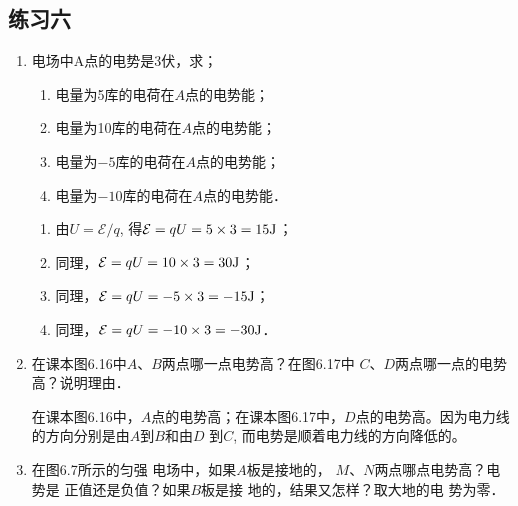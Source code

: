 \subsection{练习六}

\begin{enumerate}
	\item 电场中A点的电势是3伏，求；
	\begin{enumerate}
		\item 电量为5库的电荷在$A$点的电势能；
		\item 电量为10库的电荷在$A$点的电势能；
		\item 电量为$-5$库的电荷在$A$点的电势能；
		\item 电量为$-10$库的电荷在$A$点的电势能．
	\end{enumerate}

    \begin{solution}
\begin{enumerate}
    \item 由$U=\mathcal{E}/q$, 得$\mathcal{E}=qU=5\times3=15{\rm J}$；
    \item 同理，$\mathcal{E}=qU=10\times3=30{\rm J}$；
    \item 同理，$\mathcal{E}=qU=-5\times3=-15{\rm J}$；
    \item 同理，$\mathcal{E}=qU=-10\times3=-30{\rm J}$．
\end{enumerate}
    \end{solution}
    
	\item 在课本图6.16中$A$、$B$两点哪一点电势高？在图6.17中
$C$、$D$两点哪一点的电势高？说明理由．


\begin{solution}
    在课本图6.16中，$A$点的电势高；在课本图6.17中，$D$点的电势高。因为电力线的方向分别是由$A$到$B$和由$D$
    到$C$, 而电势是顺着电力线的方向降低的。
\end{solution}

\item 在图6.7所示的匀强
电场中，如果$A$板是接地的，
$M$、$N$两点哪点电势高？电势是
正值还是负值？如果$B$板是接
地的，结果又怎样？取大地的电
势为零．

\begin{figure}[htp]\centering
    \caption{}
\end{figure}	



\end{enumerate}
